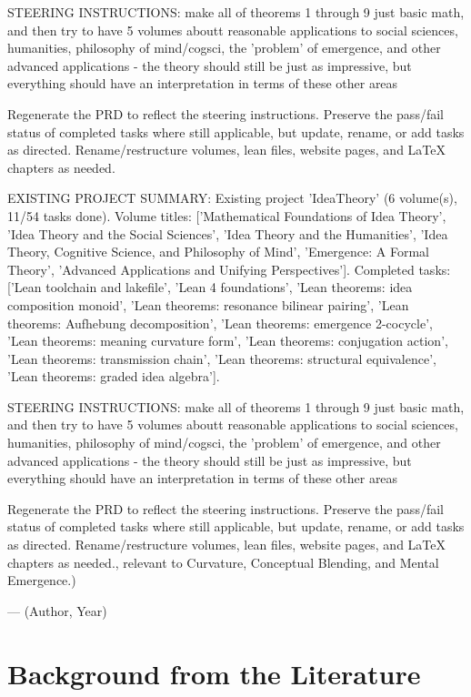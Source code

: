 {STEERING INSTRUCTIONS: make all of theorems 1 through 9 just basic math, and then try to have 5 volumes aboutt reasonable applications to social sciences, humanities, philosophy of mind/cogsci, the 'problem' of emergence, and other advanced applications - the theory should still be just as impressive, but everything should have an interpretation in terms of these other areas

Regenerate the PRD to reflect the steering instructions. Preserve the pass/fail status of completed tasks where still applicable, but update, rename, or add tasks as directed. Rename/restructure volumes, lean files, website pages, and LaTeX chapters as needed.

EXISTING PROJECT SUMMARY: Existing project 'IdeaTheory' (6 volume(s), 11/54 tasks done). Volume titles: ['Mathematical Foundations of Idea Theory', 'Idea Theory and the Social Sciences', 'Idea Theory and the Humanities', 'Idea Theory, Cognitive Science, and Philosophy of Mind', 'Emergence: A Formal Theory', 'Advanced Applications and Unifying Perspectives']. Completed tasks: ['Lean toolchain and lakefile', 'Lean 4 foundations', 'Lean theorems: idea composition monoid', 'Lean theorems: resonance bilinear pairing', 'Lean theorems: Aufhebung decomposition', 'Lean theorems: emergence 2-cocycle', 'Lean theorems: meaning curvature form', 'Lean theorems: conjugation action', 'Lean theorems: transmission chain', 'Lean theorems: structural equivalence', 'Lean theorems: graded idea algebra'].

STEERING INSTRUCTIONS: make all of theorems 1 through 9 just basic math, and then try to have 5 volumes aboutt reasonable applications to social sciences, humanities, philosophy of mind/cogsci, the 'problem' of emergence, and other advanced applications - the theory should still be just as impressive, but everything should have an interpretation in terms of these other areas

Regenerate the PRD to reflect the steering instructions. Preserve the pass/fail status of completed tasks where still applicable, but update, rename, or add tasks as directed. Rename/restructure volumes, lean files, website pages, and LaTeX chapters as needed., relevant to Curvature, Conceptual Blending, and Mental Emergence.)}{--- (Author, Year)}

        \section{Background from the Literature}
        \label{sec:v4c8.lit}

